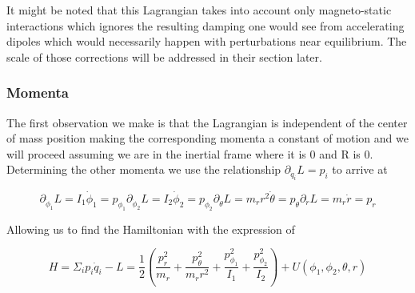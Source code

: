 \documentclass[prbg,preprint]{revtex4-1}
\begin{document}
It might be noted that this Lagrangian takes into account only magneto-static interactions which ignores the resulting damping one would see from accelerating dipoles which would necessarily happen with perturbations near equilibrium. The scale of those corrections will be addressed in their section later.

\subsubsection{Momenta}

The first observation we make is that the Lagrangian is independent of the center of mass position making the corresponding momenta a constant of motion and we will proceed assuming we are in the inertial frame where it is 0 and R is 0. Determining the other momenta we use the relationship $\partial_{\dot q_i} L =p_i$ to arrive at

\begin{subequations}
    \begin{equation}
        \partial_{\dot \phi_1} L = I_1\dot \phi_1 = p_{\phi_1}
    \end{equation}
    \begin{equation}
        \partial_{\dot \phi_2} L =I_2\dot \phi_2 = p_{\phi_2}
    \end{equation}
    \begin{equation}
        \partial_{\dot \theta} L =m_r r^2 \dot \theta = p_{\theta}
    \end{equation}
    \begin{equation}
        \partial_{\dot r} L = m_r \dot r = p_r
    \end{equation}
\end{subequations}

Allowing us to find the Hamiltonian with the expression of 

\begin{equation}
H=\Sigma_i p_i \dot q_i - L
=
\frac{1}{2}(
	\frac{p_r^2}{m_r}
	+\frac{p_\theta^2}{m_r r^2}
	+\frac{p_{\phi_1}^2}{I_1}
	+\frac{p_{\phi_2}^2}{I_2}
)+U(\phi_1,\phi_2,\theta, r)
\end{equation}
\end{document}
